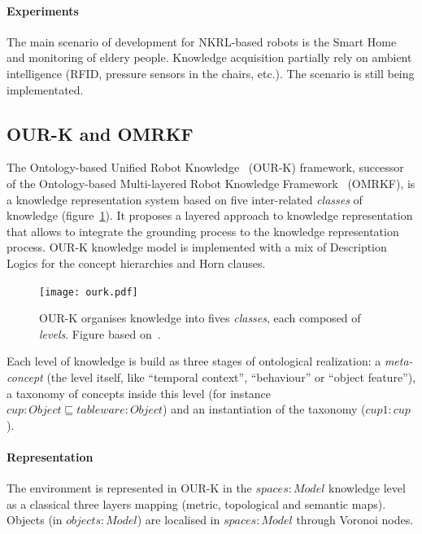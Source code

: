 \documentclass[a4paper, twocolumn]{article}
\begin{document}
\paragraph{Experiments} The main scenario of development for NKRL-based robots
is the Smart Home and monitoring of eldery people. Knowledge acquisition
partially rely on ambient intelligence (RFID, pressure sensors in the chairs,
etc.). The scenario is still being implementated.

\subsection{OUR-K and OMRKF}
\label{sect|omrkf}

The Ontology-based Unified Robot Knowledge~\cite{Lim2011} (OUR-K) framework,
successor of the Ontology-based Multi-layered Robot Knowledge
Framework~\cite{Suh2007} (OMRKF), is a knowledge representation system based on
five inter-related \emph{classes} of knowledge (figure~\ref{fig|omrkf}). It
proposes a layered approach to knowledge representation that allows to
integrate the grounding process to the knowledge representation process. OUR-K
knowledge model is implemented with a mix of Description Logics for the concept
hierarchies and Horn clauses.

\begin{figure}
    \centering
    \texttt{[image: ourk.pdf]}

    \caption{OUR-K organises knowledge into fives \emph{classes}, each composed
    of \emph{levels}. Figure based on~\cite{Lim2011}.}

    \label{fig|omrkf}
\end{figure}

Each level of knowledge is build as three stages of ontological realization: a
\emph{meta-concept} (the level itself, like ``temporal context'', ``behaviour''
or ``object feature''), a taxonomy of concepts inside this level (for instance
$cup : Object \sqsubseteq tableware : Object$) and an instantiation of the
taxonomy ($cup1 : cup$).

\paragraph{Representation} The environment is represented in OUR-K in the
$spaces : Model$ knowledge level as a classical three layers mapping (metric,
topological and semantic maps). Objects (in $objects : Model$) are localised in
$spaces : Model$ through Voronoi nodes.
\end{document}

